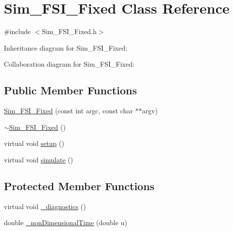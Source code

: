 \hypertarget{class_sim___f_s_i___fixed}{}\section{Sim\+\_\+\+F\+S\+I\+\_\+\+Fixed Class Reference}
\label{class_sim___f_s_i___fixed}


{\ttfamily \#include $<$Sim\+\_\+\+F\+S\+I\+\_\+\+Fixed.\+h$>$}



Inheritance diagram for Sim\+\_\+\+F\+S\+I\+\_\+\+Fixed\+:


Collaboration diagram for Sim\+\_\+\+F\+S\+I\+\_\+\+Fixed\+:
\subsection*{Public Member Functions}
\begin{DoxyCompactItemize}
\item 
\hyperlink{class_sim___f_s_i___fixed_aafc7f4d24e8753e801d70b9a69b2456c}{Sim\+\_\+\+F\+S\+I\+\_\+\+Fixed} (const int argc, const char $\ast$$\ast$argv)
\item 
\hyperlink{class_sim___f_s_i___fixed_a4e3e80cf9ae0a31cc85a491fc9fc3766}{$\sim$\+Sim\+\_\+\+F\+S\+I\+\_\+\+Fixed} ()
\item 
virtual void \hyperlink{class_sim___f_s_i___fixed_a9da9f0d775b05a9a9c77003914af307c}{setup} ()
\item 
virtual void \hyperlink{class_sim___f_s_i___fixed_a1e37b29e07ddd05ae1f0c2be321e9bb2}{simulate} ()
\end{DoxyCompactItemize}
\subsection*{Protected Member Functions}
\begin{DoxyCompactItemize}
\item 
virtual void \hyperlink{class_sim___f_s_i___fixed_ac140ab0a939bb401b682fecbf43480a1}{\+\_\+diagnostics} ()
\item 
double \hyperlink{class_sim___f_s_i___fixed_ab432f7aa27b4c3a2fbbf15a955dcd700}{\+\_\+non\+Dimensional\+Time} (double u)
\end{DoxyCompactItemize}
